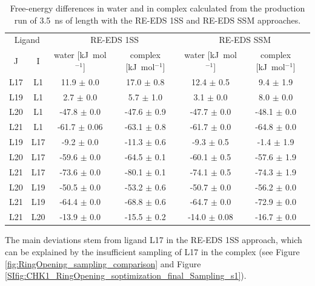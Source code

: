 \begin{table}[H]
\caption{Free-energy differences in water and in complex calculated from the production run of 3.5~ns of length with the RE-EDS 1SS and RE-EDS SSM approaches.}
\label{SItab: RE-EDS_FE_RingCycleOpening_dFs}
\begin{center}
\begin{adjustbox}{max width=\textwidth}
\begin{tabular}{ c c |c c |c c}
  \multicolumn{2}{c|}{Ligand} & \multicolumn{2}{c|}{RE-EDS 1SS} &\multicolumn{2}{c}{RE-EDS SSM}\\ 
  J & I  & water [kJ~mol$^{-1}$] & complex [kJ~mol$^{-1}$]  & water [kJ~mol$^{-1}$] & complex [kJ~mol$^{-1}$] \\
  \hline
        L17 &         L1 &       11.9 $\pm$ 0.0&        17.0 $\pm$ 0.8&   12.4 $\pm$ 0.5&   9.4 $\pm$ 1.9\\
        L19 &         L1 &        2.7 $\pm$ 0.0&        5.7 $\pm$ 1.0&     3.1 $\pm$ 0.0&   8.0 $\pm$ 0.0\\
        L20 &         L1 &      -47.8 $\pm$ 0.0&      -47.6 $\pm$ 0.9& -47.7 $\pm$ 0.0&  -48.1 $\pm$ 0.0\\
        L21 &         L1 &      -61.7 $\pm$ 0.06&     -63.1 $\pm$ 0.8& -61.7 $\pm$ 0.0&  -64.8 $\pm$ 0.0\\
        L19 &         L17 &      -9.2 $\pm$ 0.0&      -11.3 $\pm$ 0.6&  -9.3 $\pm$ 0.5&   -1.4 $\pm$ 1.9\\
        L20 &         L17 &     -59.6 $\pm$ 0.0&      -64.5 $\pm$ 0.1& -60.1 $\pm$ 0.5&  -57.6 $\pm$ 1.9\\
        L21 &         L17 &     -73.6 $\pm$ 0.0&      -80.1 $\pm$ 0.1& -74.1 $\pm$ 0.5&  -74.3 $\pm$ 1.9\\
        L20 &         L19 &     -50.5 $\pm$ 0.0&      -53.2 $\pm$ 0.6& -50.7 $\pm$ 0.0&  -56.2 $\pm$ 0.0\\
        L21 &         L19 &     -64.4 $\pm$ 0.0&      -68.8 $\pm$ 0.6& -64.7 $\pm$ 0.0&  -72.9 $\pm$ 0.0\\
        L21 &         L20 &     -13.9 $\pm$ 0.0&      -15.5 $\pm$ 0.2& -14.0 $\pm$ 0.08& -16.7 $\pm$ 0.0 \\
\end{tabular}
\end{adjustbox}
\end{center}
\end{table}

The main deviations stem from ligand L17 in the RE-EDS 1SS approach, which can be explained by the insufficient sampling of L17 in the complex (see Figure \ref{fig:RingOpening_sampling_comparison} and Figure \ref{SIfig:CHK1_RingOpening_soptimization_final_Sampling_s1}).

